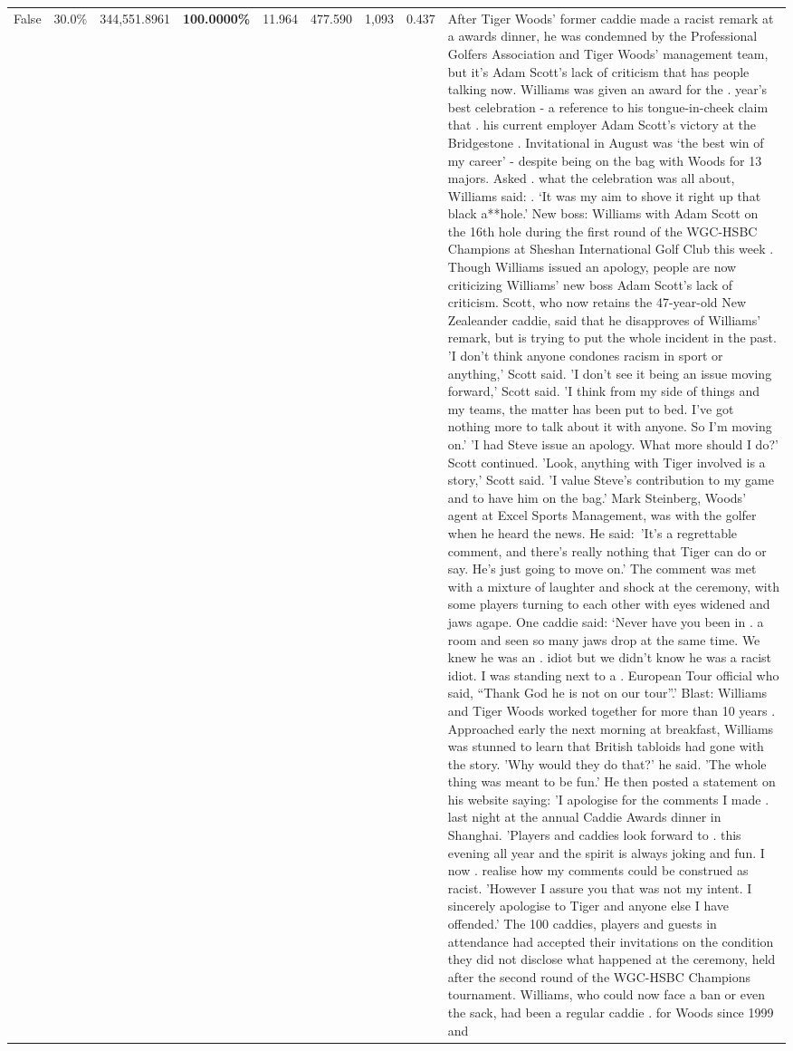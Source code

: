 \begin{table}[H]
\begin{tabular}{lllrlllll}
False & 30.0\% & 344,551.8961 & \bfseries \color{red} 100.0000\% & 11.964 & 477.590 & 1,093 & 0.437 & After Tiger Woods' former caddie made a racist remark at a awards dinner, he was condemned by the Professional Golfers Association and Tiger Woods' management team, but it's Adam Scott's lack of criticism that has people talking now. Williams was given an award for the . year’s best celebration - a reference to his tongue-in-cheek claim that . his current employer Adam Scott’s victory at the Bridgestone . Invitational in August was ‘the best win of my career’ - despite being on the bag with Woods for 13 majors. Asked . what the celebration was all about, Williams said: . ‘It was my aim to shove it right up that black a**hole.’ New boss: Williams with Adam Scott  on the 16th hole during the first round of the WGC-HSBC Champions at Sheshan International Golf Club this week . Though Williams issued an apology, people are now criticizing Williams' new boss Adam Scott's lack of criticism. Scott, who now retains the 47-year-old New Zealeander caddie, said that he disapproves of Williams' remark, but is trying to put the whole incident in the past. 'I don't think anyone condones racism in sport or anything,' Scott said. 'I don't see it being an issue moving forward,' Scott said. 'I think from my side of things and my teams, the matter has been put to bed. I've got nothing more to talk about it with anyone. So I'm moving on.' 'I had Steve issue an apology. What more should I do?' Scott continued. 'Look, anything with Tiger involved is a story,' Scott said. 'I value Steve's contribution to my game and to have him on the bag.' Mark Steinberg, Woods' agent at Excel Sports Management, was with the golfer when he heard the news. He said: 'It's a regrettable comment, and there's really nothing that Tiger can do or say. He's just going to move on.' The comment was met with a mixture of laughter and shock at the ceremony, with some players turning to each other with eyes widened and jaws agape. One caddie said: ‘Never have you been in . a room and seen so many jaws drop at the same time. We knew he was an . idiot but we didn’t know he was a racist idiot. I was standing next to a . European Tour official who said, “Thank God he is not on our tour”.’ Blast: Williams and Tiger Woods worked together for more than 10 years . Approached early the next morning at breakfast, Williams was stunned to learn that British tabloids had gone with the story. 'Why would they do that?' he said. 'The whole thing was meant to be fun.' He then posted a statement on his website saying: 'I apologise for the comments I made . last night at the annual Caddie Awards dinner in Shanghai. 'Players and caddies look forward to . this evening all year and the spirit is always joking and fun. I now . realise how my comments could be construed as racist. 'However I assure you that was not my intent. I sincerely apologise to Tiger and anyone else I have offended.' The 100 caddies, players and guests in attendance had accepted their invitations on the condition they did not disclose what happened at the ceremony, held after the second round of the WGC-HSBC Champions tournament. Williams, who could now face a ban or even the sack, had been a regular caddie . for Woods since 1999 and 
\end{tabular}
\end{table}
